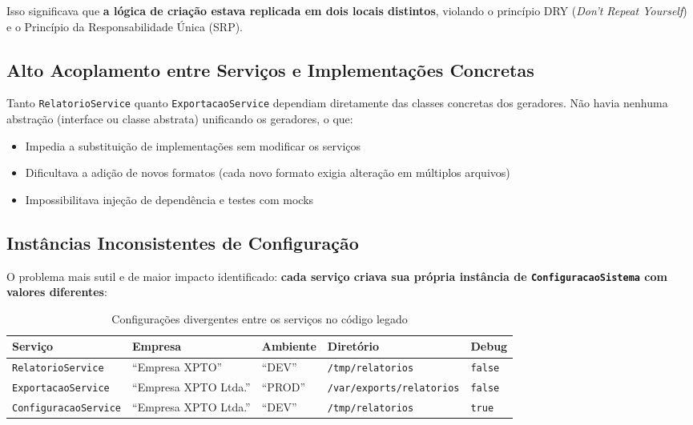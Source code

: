 \documentclass[12pt, a4paper]{article}
\begin{document}
Isso significava que \textbf{a lógica de criação estava replicada em dois locais distintos}, violando o princípio DRY (\textit{Don't Repeat Yourself}) e o Princípio da Responsabilidade Única (SRP).

\subsection{Alto Acoplamento entre Serviços e Implementações Concretas}

Tanto \texttt{RelatorioService} quanto \texttt{ExportacaoService} dependiam diretamente das classes concretas dos geradores. Não havia nenhuma abstração (interface ou classe abstrata) unificando os geradores, o que:

\begin{itemize}
    \item Impedia a substituição de implementações sem modificar os serviços
    \item Dificultava a adição de novos formatos (cada novo formato exigia alteração em múltiplos arquivos)
    \item Impossibilitava injeção de dependência e testes com mocks
\end{itemize}

\subsection{Instâncias Inconsistentes de Configuração}

O problema mais sutil e de maior impacto identificado: \textbf{cada serviço criava sua própria instância de \texttt{ConfiguracaoSistema} com valores diferentes}:

\begin{table}[h!]
\centering
\begin{adjustbox}{max width=\textwidth}
\begin{tabular}{lllll}
\toprule
\textbf{Serviço} & \textbf{Empresa} & \textbf{Ambiente} & \textbf{Diretório} & \textbf{Debug} \\
\midrule
\texttt{RelatorioService}    & ``Empresa XPTO''       & ``DEV''  & \texttt{/tmp/relatorios}       & \texttt{false} \\
\texttt{ExportacaoService}   & ``Empresa XPTO Ltda.'' & ``PROD'' & \texttt{/var/exports/relatorios} & \texttt{false} \\
\texttt{ConfiguracaoService} & ``Empresa XPTO Ltda.'' & ``DEV''  & \texttt{/tmp/relatorios}       & \texttt{true}  \\
\bottomrule
\end{tabular}
\end{adjustbox}
\caption{Configurações divergentes entre os serviços no código legado}
\end{table}
\end{document}
